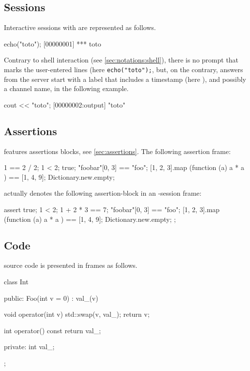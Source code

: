 \subsection{\us Sessions}

Interactive sessions with \urbi are represented as follows.

\begin{urbiscript}
echo("toto");
[00000001] *** toto
\end{urbiscript}

Contrary to shell interaction (see \autoref{sec:notations:shell}),
there is no prompt that marks the user-entered lines (here
\lstinline|echo("toto");|, but, on the contrary, answers from the \urbi
server start with a label that includes a timestamp (here
), and possibly a channel name,  in the
following example.

\begin{urbiscript}[firstnumber=last]
cout << "toto";
[00000002:output] "toto"
\end{urbiscript}


\subsection{\us Assertions}

\us features assertions blocks, see \autoref{sec:assertions}.  The
following assertion frame:

\begin{urbiassert}[firstnumber=last]
1 == 2 / 2;
1 < 2;
true;
"foobar"[0, 3] == "foo";
[1, 2, 3].map (function (a) { a * a }) == [1, 4, 9];
Dictionary.new.empty;
\end{urbiassert}

\noindent
actually denotes the following assertion-block in an \us-session
frame:

\begin{urbiscript}[firstnumber=last]
assert
{
  true;
  1 < 2;
  1 + 2 * 3 == 7;
  "foobar"[0, 3] == "foo";
  [1, 2, 3].map (function (a) { a * a }) == [1, 4, 9];
  Dictionary.new.empty;
};
\end{urbiscript}

\subsection{\Cxx Code}

\Cxx source code is presented in frames as follows.

\begin{cxx}
class Int
{
public:
  Foo(int v = 0)
    : val_(v)
  {}

  void operator(int v)
  {
    std::swap(v, val_);
    return v;
  }

  int operator() const
  {
    return val_;
  }

private:
  int val_;
};
\end{cxx}